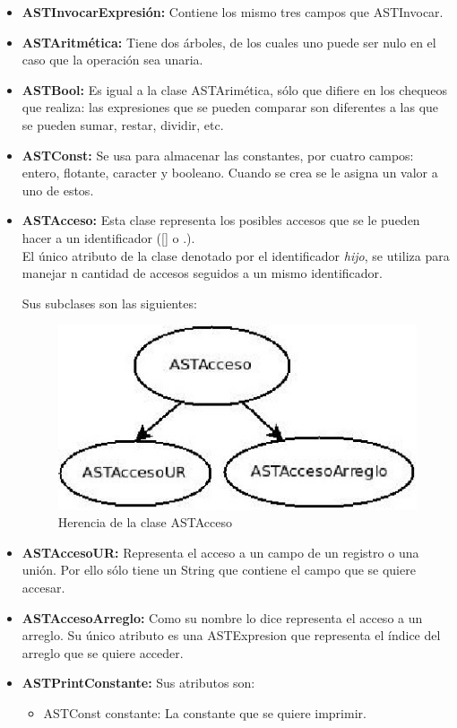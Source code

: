 \documentclass[11pt, spanish]{report}
\begin{document}
\begin{itemize}
\begin{itemize}
  \item \textbf{ASTInvocarExpresi\'on:}
    Contiene los mismo tres campos que ASTInvocar.
  \item \textbf{ASTAritm\'etica:}    
    Tiene dos \'arboles, de los cuales uno puede ser nulo en el caso que la operaci\'on sea unaria.
  \item \textbf{ASTBool:}    
    Es igual a la clase ASTArim\'etica, s\'olo que difiere en los chequeos que realiza: las expresiones que se pueden comparar son diferentes a 
    las que se pueden sumar, restar, dividir, etc.
  \item \textbf{ASTConst:}    
    Se usa para almacenar las constantes, por cuatro campos: entero, flotante, caracter y booleano. Cuando se crea se le asigna un valor a uno de estos.

  \item \textbf{ASTAcceso:}    
    Esta clase representa los posibles accesos que se le pueden hacer a un identificador ([] o .).\\

    El \'unico atributo de la clase denotado por el identificador \emph{hijo}, se utiliza para manejar n cantidad de accesos seguidos a un mismo identificador.

    Sus subclases son las siguientes:

    \begin{figure}[htp]
      \centering
      \mbox{\includegraphics[scale=0.5]{acceso.jpg}}
      \caption{Herencia de la clase ASTAcceso}
      \label{fig acceso}
    \end{figure}

  \item \textbf{ASTAccesoUR:}    
    Representa el acceso a un campo de un registro o una uni\'on. Por ello s\'olo tiene un String que contiene el campo que se quiere accesar.    
  \item \textbf{ASTAccesoArreglo:}
    Como su nombre lo dice representa el acceso a un arreglo. Su \'unico atributo es una ASTExpresion que representa el \'indice del arreglo que se quiere acceder.
  \item \textbf{ASTPrintConstante:}
    Sus atributos son:
    \begin{itemize}
    \item ASTConst constante: La constante que se quiere imprimir.
    \end{itemize}


\end{itemize}
\end{itemize}
\end{document}
